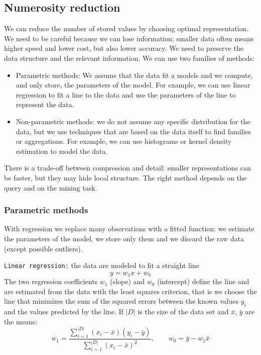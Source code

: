 \subsection{Numerosity reduction}
We can reduce the number of stored values by choosing optimal representation. We need to be careful because we can lose information: smaller data often means higher speed and lower cost, but also lower accuracy. We need to preserve the data structure and the relevant information. We can use two families of methods:
\begin{itemize}
    \item Parametric methods: We assume that the data fit a models and we compute, and only store, the parameters of the model. For example, we can use linear regression to fit a line to the data and use the parameters of the line to represent the data.
    \item Non-parametric methods: we do not assume any specific distribution for the data, but we use techniques that are based on the data itself to find families or aggregations. For example, we can use histograms or kernel density estimation to model the data.
\end{itemize}
There is a trade-off between compression and detail: smaller representations can be faster, but they may hide local structure. The right method depends on the query and on the mining task.

\subsubsection{Parametric methods}
With regression we replace many observations with a fitted function: we estimate the parameters of the model, we store only them and we discard the raw data (except possible outliers).

\texttt{Linear regression:} the data are modeled to fit a straight line
\[
    y = w_1x + w_0
\]
The two regression coefficients $w_1$ (slope) and $w_0$ (intercept) define the line and are estimated from the data with the least squares criterion, that is we choose the line that minimizes the sum of the squared errors between the known values $y_i$ and the values predicted by the line. If $|D|$ is the size of the data set and $\bar{x}$, $\bar{y}$ are the means:
\[
    w_1 = \frac{\sum_{i=1}^{|D|}(x_i-\bar{x})(y_i-\bar{y})}{\sum_{i=1}^{|D|}(x_i-\bar{x})^2}, \qquad w_0 = \bar{y}-w_1\bar{x}
\]

